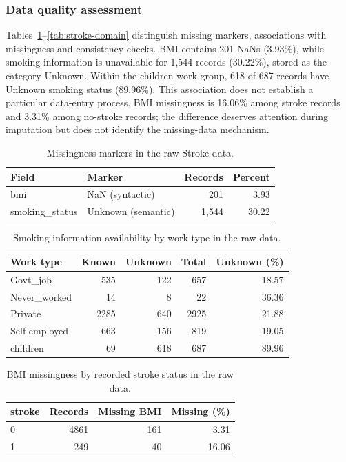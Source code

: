 \documentclass[12pt, a4paper]{article}
\begin{document}
\subsubsection{Data quality assessment}
Tables~\ref{tab:stroke-missing}--\ref{tab:stroke-domain} distinguish missing markers, associations with missingness and consistency checks. BMI contains 201 NaNs (3.93\%), while smoking information is unavailable for 1,544 records (30.22\%), stored as the category Unknown. Within the children work group, 618 of 687 records have Unknown smoking status (89.96\%). This association does not establish a particular data-entry process. BMI missingness is 16.06\% among stroke records and 3.31\% among no-stroke records; the difference deserves attention during imputation but does not identify the missing-data mechanism.
\begin{table}[htbp]
\centering\small
\setlength{\tabcolsep}{4pt}\renewcommand{\arraystretch}{1.12}
\caption{Missingness markers in the raw Stroke data.}
\label{tab:stroke-missing}
\begin{tabular}{p{.26\linewidth}p{.32\linewidth}rr}
\toprule
\raggedright \textbf{Field} & \raggedright \textbf{Marker} & \textbf{Records} & \textbf{Percent} \tabularnewline
\midrule
\raggedright bmi & \raggedright NaN (syntactic) & 201 & 3.93 \tabularnewline
\raggedright smoking\_status & \raggedright Unknown (semantic) & 1,544 & 30.22 \tabularnewline
\bottomrule
\end{tabular}
\end{table}
\begin{table}[htbp]
\centering\small
\setlength{\tabcolsep}{4pt}\renewcommand{\arraystretch}{1.12}
\caption{Smoking-information availability by work type in the raw data.}
\label{tab:stroke-smoking}
\begin{tabular}{lrrrr}
\toprule
\textbf{Work type} & \textbf{Known} & \textbf{Unknown} & \textbf{Total} & \textbf{Unknown (\%)} \tabularnewline
\midrule
Govt\_job & 535 & 122 & 657 & 18.57 \tabularnewline
Never\_worked & 14 & 8 & 22 & 36.36 \tabularnewline
Private & 2285 & 640 & 2925 & 21.88 \tabularnewline
Self-employed & 663 & 156 & 819 & 19.05 \tabularnewline
children & 69 & 618 & 687 & 89.96 \tabularnewline
\bottomrule
\end{tabular}
\end{table}
\begin{table}[htbp]
\centering\small
\setlength{\tabcolsep}{4pt}\renewcommand{\arraystretch}{1.12}
\caption{BMI missingness by recorded stroke status in the raw data.}
\label{tab:stroke-missing-target}
\begin{tabular}{lrrr}
\toprule
\textbf{stroke} & \textbf{Records} & \textbf{Missing BMI} & \textbf{Missing (\%)} \tabularnewline
\midrule
0 & 4861 & 161 & 3.31 \tabularnewline
1 & 249 & 40 & 16.06 \tabularnewline
\bottomrule
\end{tabular}
\end{table}
\end{document}
